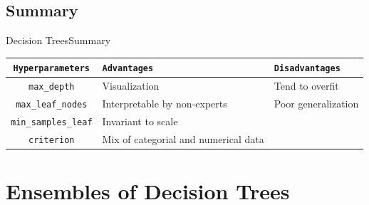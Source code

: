 \documentclass[10pt,compress]{beamer} %
\begin{document}
\subsection{Summary}
\begin{frame}{Decision Trees}{Summary}
	\begin{center}
	\begin{tabular}{cp{3cm}p{3cm}}\hline
	 	\texttt{Hyperparameters}  & \texttt{Advantages}  & \texttt{Disadvantages} \\\hline
	 	\texttt{max\_depth}       & Visualization        & Tend to overfit  \\
	 	\texttt{max\_leaf\_nodes} & Interpretable by non-experts     & Poor generalization  \\
	 	\texttt{min\_samples\_leaf} & Invariant to scale     &   \\
	 	\texttt{criterion} & Mix of categorial and numerical data     &   \\
	 	\hline
	\end{tabular}
	\end{center}
\end{frame}

\section{Ensembles of Decision Trees}
\end{document}
